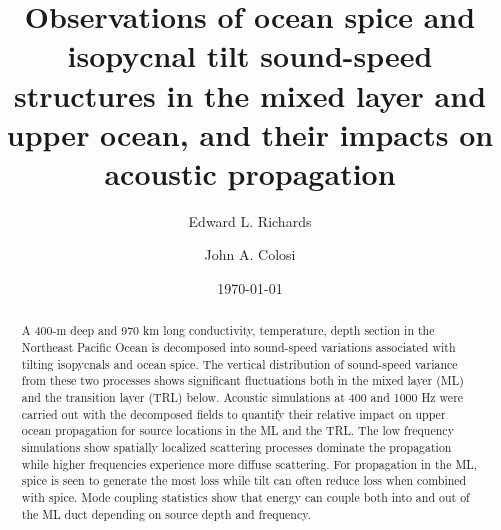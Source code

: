 \documentclass[preprint,NumberedRefs]{JASA}
\begin{document}
\title[Mixed layer tilt and spice]{Observations of ocean spice and isopycnal tilt sound-speed structures in the mixed layer and upper ocean, and their impacts on acoustic propagation}
\author{Edward L. Richards}
\author{John A. Colosi}

\date{\today}

\begin{abstract}
A 400-m deep and 970 km long conductivity, temperature, depth section in the Northeast Pacific Ocean is decomposed into sound-speed variations associated with tilting isopycnals and ocean spice. The vertical distribution of sound-speed variance from these two processes shows significant fluctuations both in the mixed layer (ML) and the transition layer (TRL) below. Acoustic simulations at 400 and 1000 Hz were carried out with the decomposed fields to quantify their relative impact on upper ocean propagation for source locations in the ML and the TRL. The low frequency simulations show spatially localized scattering processes dominate the propagation while higher frequencies experience more diffuse scattering. For propagation in the ML, spice is seen to generate the most loss while tilt can often reduce loss when combined with spice. Mode coupling statistics show that energy can couple both into and out of the ML duct depending on source depth and frequency.
\end{abstract}
\renewcommand{\arraystretch}{0.5}
\maketitle
\end{document}

